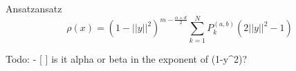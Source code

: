 \begin{definition}{Ansatz}{ansatz}
  \[\rho(x) = (1-||{y}||^{2})^{m - \frac{\alpha + d}{2}} \sum_{k=1}^{N} P_{k}^{(a,b)}(2 ||y||^{2}-1)\]

  Todo: - {[} {]} is it alpha or beta in the exponent of (1-y\^{}2)?
\end{definition}
